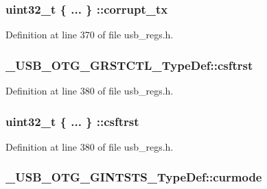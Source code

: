 \hypertarget{group___u_s_b___o_t_g___d_r_i_v_e_r_ga1d67d710c78c7d953741d80cb901b7ea}{
\subsubsection[{corrupt\-\_\-tx}]{\setlength{\rightskip}{0pt plus 5cm}uint32\-\_\-t \{ ... \} \-::corrupt\-\_\-tx}}\label{group___u_s_b___o_t_g___d_r_i_v_e_r_ga1d67d710c78c7d953741d80cb901b7ea}


Definition at line 370 of file usb\-\_\-regs.\-h.

\hypertarget{group___u_s_b___o_t_g___d_r_i_v_e_r_gaff6144b9dc68f62487e3e19efcff1a20}{
\subsubsection[{csftrst}]{ \-\_\-\-U\-S\-B\-\_\-\-O\-T\-G\-\_\-\-G\-R\-S\-T\-C\-T\-L\-\_\-\-Type\-Def\-::csftrst}}\label{group___u_s_b___o_t_g___d_r_i_v_e_r_gaff6144b9dc68f62487e3e19efcff1a20}


Definition at line 380 of file usb\-\_\-regs.\-h.

\hypertarget{group___u_s_b___o_t_g___d_r_i_v_e_r_gaeb9ce0190e7dc7500b71cdd8ec39819e}{
\subsubsection[{csftrst}]{\setlength{\rightskip}{0pt plus 5cm}uint32\-\_\-t \{ ... \} \-::csftrst}}\label{group___u_s_b___o_t_g___d_r_i_v_e_r_gaeb9ce0190e7dc7500b71cdd8ec39819e}


Definition at line 380 of file usb\-\_\-regs.\-h.

\hypertarget{group___u_s_b___o_t_g___d_r_i_v_e_r_ga752eb7894d8acb9f1a4394967bfdd9ff}{
\subsubsection[{curmode}]{ \-\_\-\-U\-S\-B\-\_\-\-O\-T\-G\-\_\-\-G\-I\-N\-T\-S\-T\-S\-\_\-\-Type\-Def\-::curmode}}\label{group___u_s_b___o_t_g___d_r_i_v_e_r_ga752eb7894d8acb9f1a4394967bfdd9ff}


